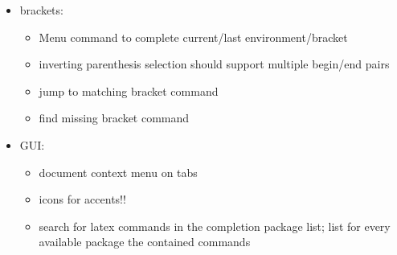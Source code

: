 \documentclass[10pt,a4paper,landscape]{report}
\begin{document}
\begin{itemize}
\begin{itemize}
	\item auto close last environment/bracket
	\item complete command options after command (files for includegraphics, environsments for begin, citations, labels, packages, tikzpictures	)
	\item cut buffer for environment content (multiline to content, singleline to option ?)
	\item Word completion over all open documents
	\item Show definition of \verb+\newcommand+ commands in the completion list as hint
	\item \verb+\begin{Umgebungsname}+ should not add \verb+\end{Umgebungsname}+ if that \textbackslash end is already in the next/a later line
	 	\item Open completion list of xyz if cursor is after \verb+\xyz{+ (= ignore \verb+{}+ before cursor)
		\item treat \verb+\+abc\{\%<xyz\%>\} and \verb+\+abc\{\%<def\%>\} as identical and ignore one of them (in the list of possible completions)
		\item Understand \verb+newcounter, tex: \newcount \newfont \def, \edef, \xdef, \gdef+
		\item Detect completion within tikz/pstricks/... environments and show a list of corresponding tikz/... commands
		\item text completion should show parameters of commands (e.g. reference names) even if they aren't currently used
		\item merging text completion and spell checker cache?
	\end{itemize}
	\item brackets: \begin{itemize}
		\item Menu command to complete current/last environment/bracket
		\item inverting parenthesis selection should support multiple begin/end pairs
		\item jump to matching bracket command
		\item find missing bracket command
	\end{itemize}  
	\item GUI: \begin{itemize}
	\item document context menu on tabs
	\item icons for accents!!
		\item search for latex commands in the completion package list; list for every available package the contained commands

\end{itemize}
\end{itemize}
\end{document}
